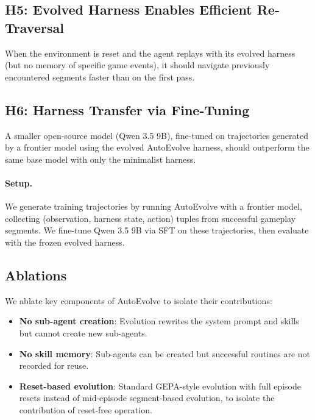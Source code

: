 
\subsection{H5: Evolved Harness Enables Efficient Re-Traversal}

When the environment is reset and the agent replays with its evolved harness (but no memory of specific game events), it should navigate previously encountered segments faster than on the first pass.


\subsection{H6: Harness Transfer via Fine-Tuning}

A smaller open-source model (Qwen 3.5 9B), fine-tuned on trajectories generated by a frontier model using the evolved AutoEvolve harness, should outperform the same base model with only the minimalist harness.

\paragraph{Setup.} We generate training trajectories by running AutoEvolve with a frontier model, collecting (observation, harness state, action) tuples from successful gameplay segments. We fine-tune Qwen 3.5 9B via SFT on these trajectories, then evaluate with the frozen evolved harness.


\subsection{Ablations}

We ablate key components of AutoEvolve to isolate their contributions: 

\begin{itemize}
    \item \textbf{No sub-agent creation}: Evolution rewrites the system prompt and skills but cannot create new sub-agents.
    \item \textbf{No skill memory}: Sub-agents can be created but successful routines are not recorded for reuse.
    \item \textbf{Reset-based evolution}: Standard GEPA-style evolution with full episode resets instead of mid-episode segment-based evolution, to isolate the contribution of reset-free operation.
\end{itemize}

